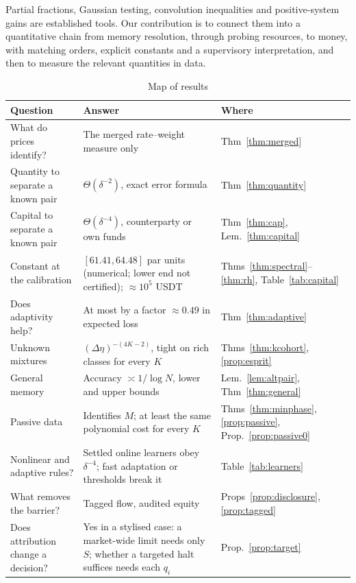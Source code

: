 \documentclass[12pt]{article}
\theoremstyle{definition}
\theoremstyle{remark}
\begin{document}
Partial fractions, Gaussian testing, convolution inequalities and positive-system gains are established tools. Our contribution is to connect them into a quantitative chain from memory resolution, through probing resources, to money, with matching orders, explicit constants and a supervisory interpretation, and then to measure the relevant quantities in data.

\begin{table}[t]\centering\small
\begin{threeparttable}
\caption{Map of results}\label{tab:map}
\begin{tabular}{p{}p{}p{}}
\toprule
Question & Answer & Where\\
\midrule
What do prices identify? & The merged rate--weight measure only & Thm~\ref{thm:merged}\\
Quantity to separate a known pair & $\Theta(\delta^{-2})$, exact error formula & Thm~\ref{thm:quantity}\\
Capital to separate a known pair & $\Theta(\delta^{-4})$, counterparty or own funds & Thm~\ref{thm:cap}, Lem.~\ref{thm:capital}\\
Constant at the calibration & $[61.41,64.48]$ par units (numerical; lower end not certified); $\approx10^5$ USDT & Thms~\ref{thm:spectral}--\ref{thm:rh}, Table~\ref{tab:capital}\\
Does adaptivity help? & At most by a factor $\approx0.49$ in expected loss & Thm~\ref{thm:adaptive}\\
Unknown mixtures & $(\Delta\eta)^{-(4K-2)}$, tight on rich classes for every $K$ & Thms~\ref{thm:kcohort}, \ref{prop:esprit}\\
General memory & Accuracy $\asymp1/\log N$, lower and upper bounds & Lem.~\ref{lem:altpair}, Thm~\ref{thm:general}\\
Passive data & Identifies $M$; at least the same polynomial cost for every $K$ & Thms~\ref{thm:minphase}, \ref{prop:passive}, Prop.~\ref{prop:passive0}\\
Nonlinear and adaptive rules? & Settled online learners obey $\delta^{-4}$; fast adaptation or thresholds break it & Table~\ref{tab:learners}\\
What removes the barrier? & Tagged flow, audited equity & Props~\ref{prop:disclosure}, \ref{prop:tagged}\\
Does attribution change a decision? & Yes in a stylised case: a market-wide limit needs only $S$; whether a targeted halt suffices needs each $q_i$ & Prop.~\ref{prop:target}\\

\end{tabular}
\end{threeparttable}
\end{table}
\end{document}
